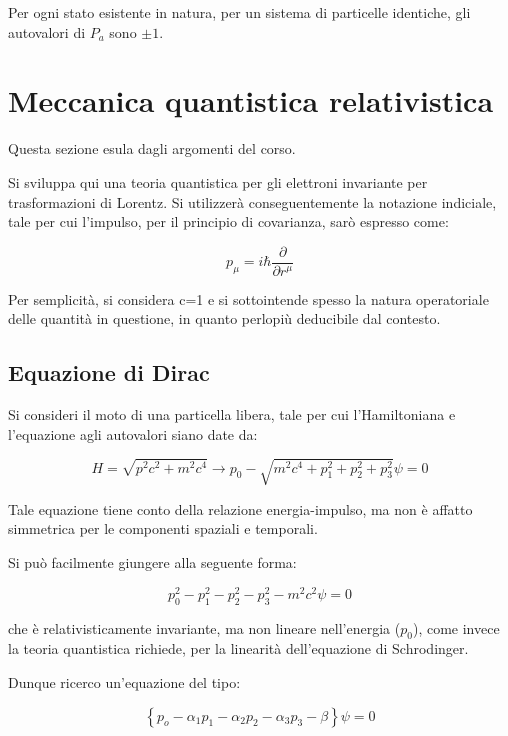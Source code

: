 \documentclass{article}
\begin{document}
Per ogni stato esistente in natura, per un sistema di particelle identiche, gli autovalori di $P_a$ sono $\pm 1$.

\section{Meccanica quantistica relativistica}
Questa sezione esula dagli argomenti del corso.

Si sviluppa qui una teoria quantistica per gli elettroni invariante per trasformazioni di Lorentz.
Si utilizzerà conseguentemente la notazione indiciale, tale per cui l'impulso, per il principio di covarianza, sarò espresso come:

\begin{equation}
    p_\mu=i\hbar\frac{\partial}{\partial r^{\mu}}
\end{equation}


Per semplicità, si considera c=1 e si sottointende spesso la natura operatoriale delle quantità in questione, in quanto perlopiù deducibile
dal contesto.

\subsection{Equazione di Dirac}


Si consideri il moto di una particella libera, tale per cui l'Hamiltoniana e l'equazione agli autovalori siano date da:

\begin{equation}
    H=\sqrt{p^2c^2+m^2c^4} \rightarrow p_0-\sqrt{m^2c^4+p_1^2+p_2^2+p_3^2}\psi=0
\end{equation}

Tale equazione tiene conto della relazione energia-impulso, ma non è affatto simmetrica per le componenti spaziali e temporali.

Si può facilmente giungere alla seguente forma:

\begin{equation}
    {p_0^2-p_1^2-p_2^2-p_3^2-m^2c^2}\psi=0
\end{equation}

che è relativisticamente invariante, ma non lineare nell'energia ($p_0$), come invece la teoria quantistica richiede, per la linearità dell'equazione di Schrodinger.

Dunque ricerco un'equazione del tipo:

\begin{equation}
    \left\{p_o-\alpha_1p_1-\alpha_2p_2-\alpha_3p_3-\beta\right\}\psi=0
\end{equation}
\end{document}
